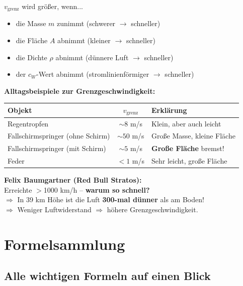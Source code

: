 \documentclass[11pt,a4paper]{article}
\begin{document}
\begin{merksatz}
$v_{\text{grenz}}$ wird größer, wenn...
\begin{itemize}
\item die Masse $m$ zunimmt (schwerer $\rightarrow$ schneller)
\item die Fläche $A$ abnimmt (kleiner $\rightarrow$ schneller)
\item die Dichte $\rho$ abnimmt (dünnere Luft $\rightarrow$ schneller)
\item der $c_W$-Wert abnimmt (stromlinienförmiger $\rightarrow$ schneller)
\end{itemize}
\end{merksatz}

\begin{beispiel}
\textbf{Alltagsbeispiele zur Grenzgeschwindigkeit:}

\begin{tabular}{|l|c|l|}
\hline
\rowcolor{lightblue}
\textbf{Objekt} & $v_{\text{grenz}}$ & \textbf{Erklärung} \\
\hline
Regentropfen & $\sim 8$ m/s & Klein, aber auch leicht \\
\hline
Fallschirmspringer (ohne Schirm) & $\sim 50$ m/s & Große Masse, kleine Fläche \\
\hline
Fallschirmspringer (mit Schirm) & $\sim 5$ m/s & \textbf{Große Fläche} bremst! \\
\hline
Feder & $< 1$ m/s & Sehr leicht, große Fläche \\
\hline
\end{tabular}

\vspace{0.3cm}
\textbf{Felix Baumgartner (Red Bull Stratos):}\\
Erreichte $>$1000 km/h -- \textbf{warum so schnell?}\\
$\Rightarrow$ In 39 km Höhe ist die Luft \textbf{300-mal dünner} als am Boden!\\
$\Rightarrow$ Weniger Luftwiderstand $\Rightarrow$ höhere Grenzgeschwindigkeit.
\end{beispiel}

\newpage
\section{Formelsammlung}

\subsection{Alle wichtigen Formeln auf einen Blick}
\end{document}
